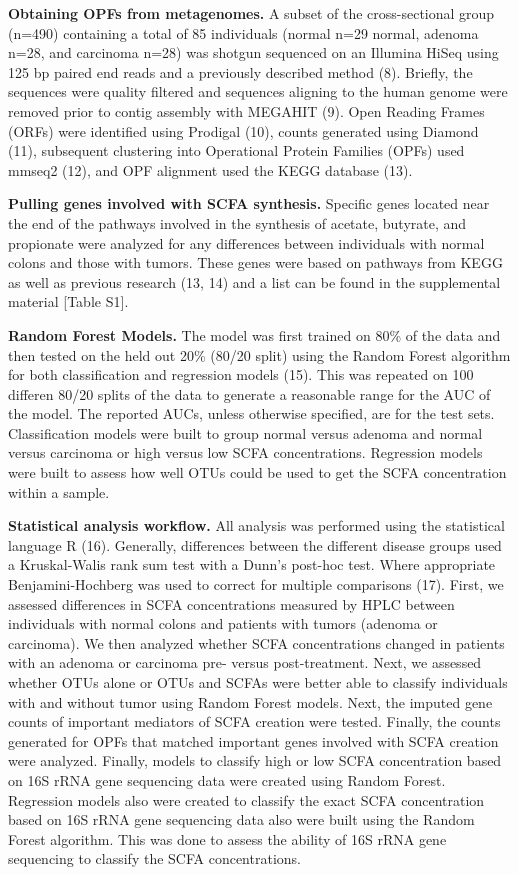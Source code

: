 \documentclass[11pt,]{article}
\begin{document}
\textbf{Obtaining OPFs from metagenomes.} A subset of the
cross-sectional group (n=490) containing a total of 85 individuals
(normal n=29 normal, adenoma n=28, and carcinoma n=28) was shotgun
sequenced on an Illumina HiSeq using 125 bp paired end reads and a
previously described method (8). Briefly, the sequences were quality
filtered and sequences aligning to the human genome were removed prior
to contig assembly with MEGAHIT (9). Open Reading Frames (ORFs) were
identified using Prodigal (10), counts generated using Diamond (11),
subsequent clustering into Operational Protein Families (OPFs) used
mmseq2 (12), and OPF alignment used the KEGG database (13).

\textbf{Pulling genes involved with SCFA synthesis.} Specific genes
located near the end of the pathways involved in the synthesis of
acetate, butyrate, and propionate were analyzed for any differences
between individuals with normal colons and those with tumors. These
genes were based on pathways from KEGG as well as previous research (13,
14) and a list can be found in the supplemental material {[}Table S1{]}.

\textbf{Random Forest Models.} The model was first trained on 80\% of
the data and then tested on the held out 20\% (80/20 split) using the
Random Forest algorithm for both classification and regression models
(15). This was repeated on 100 differen 80/20 splits of the data to
generate a reasonable range for the AUC of the model. The reported AUCs,
unless otherwise specified, are for the test sets. Classification models
were built to group normal versus adenoma and normal versus carcinoma or
high versus low SCFA concentrations. Regression models were built to
assess how well OTUs could be used to get the SCFA concentration within
a sample.

\textbf{Statistical analysis workflow.} All analysis was performed using
the statistical language R (16). Generally, differences between the
different disease groups used a Kruskal-Walis rank sum test with a
Dunn's post-hoc test. Where appropriate Benjamini-Hochberg was used to
correct for multiple comparisons (17). First, we assessed differences in
SCFA concentrations measured by HPLC between individuals with normal
colons and patients with tumors (adenoma or carcinoma). We then analyzed
whether SCFA concentrations changed in patients with an adenoma or
carcinoma pre- versus post-treatment. Next, we assessed whether OTUs
alone or OTUs and SCFAs were better able to classify individuals with
and without tumor using Random Forest models. Next, the imputed gene
counts of important mediators of SCFA creation were tested. Finally, the
counts generated for OPFs that matched important genes involved with
SCFA creation were analyzed. Finally, models to classify high or low
SCFA concentration based on 16S rRNA gene sequencing data were created
using Random Forest. Regression models also were created to classify the
exact SCFA concentration based on 16S rRNA gene sequencing data also
were built using the Random Forest algorithm. This was done to assess
the ability of 16S rRNA gene sequencing to classify the SCFA
concentrations.
\end{document}
